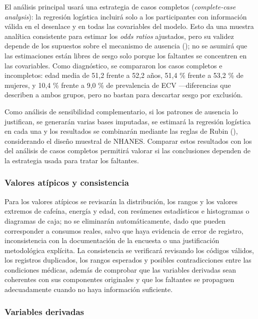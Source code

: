 \documentclass[
  spanish,
  12pt,
]{article}
\begin{document}
El análisis principal usará una estrategia de casos completos
(\emph{complete-case analysis}): la regresión logística incluirá solo a los
participantes con información válida en el desenlace y en todas las
covariables del modelo. Esto da una muestra analítica consistente para
estimar los \emph{odds ratios} ajustados, pero su validez depende de los
supuestos sobre el mecanismo de ausencia (); no
se asumirá que las estimaciones están libres de sesgo solo porque los
faltantes se concentren en las covariables. Como diagnóstico, se
compararon los casos completos e incompletos: edad media de 51,2 frente
a 52,2 años, 51,4 \% frente a 53,2 \% de mujeres, y 10,4 \% frente a 9,0 \%
de prevalencia de ECV ---diferencias que describen a ambos grupos, pero
no bastan para descartar sesgo por exclusión.

Como análisis de sensibilidad complementario, si los patrones de
ausencia lo justifican, se generarán varias bases imputadas, se
estimará la regresión logística en cada una y los resultados se
combinarán mediante las reglas de Rubin (),
considerando el diseño muestral de NHANES. Comparar estos resultados
con los del análisis de casos completos permitirá valorar si las
conclusiones dependen de la estrategia usada para tratar los faltantes.

\subsubsection{Valores atípicos y consistencia}\label{valores-atuxedpicos-y-consistencia}

Para los valores atípicos se revisarán la distribución, los rangos y
los valores extremos de cafeína, energía y edad, con resúmenes
estadísticos e histogramas o diagramas de caja; no se eliminarán
automáticamente, dado que pueden corresponder a consumos reales, salvo
que haya evidencia de error de registro, inconsistencia con la
documentación de la encuesta o una justificación metodológica
explícita. La consistencia se verificará revisando los códigos válidos,
los registros duplicados, los rangos esperados y posibles
contradicciones entre las condiciones médicas, además de comprobar que
las variables derivadas sean coherentes con sus componentes originales
y que los faltantes se propaguen adecuadamente cuando no haya
información suficiente.

\subsubsection{Variables derivadas}\label{variables-derivadas}
\end{document}

